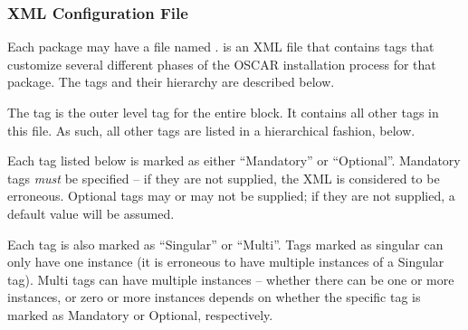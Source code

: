 
\subsubsection{XML Configuration File}
\label{sec:config-xml}

\begchange

Each package may have a file named .
 is an XML file that contains tags that customize
several different phases of the OSCAR installation process for that
package.  The tags and their hierarchy are described below.

The  tag is the outer level tag for the entire block.
It contains all other tags in this file. As such, all other tags are
listed in a hierarchical fashion, below.  

Each tag listed below is marked as either ``Mandatory'' or
``Optional''.  Mandatory tags {\em must} be specified -- if they are
not supplied, the XML is considered to be erroneous.  Optional tags
may or may not be supplied; if they are not supplied, a default value
will be assumed.  

Each tag is also marked as ``Singular'' or ``Multi''.  Tags marked as
singular can only have one instance (it is erroneous to have multiple
instances of a Singular tag).  Multi tags can have multiple instances
-- whether there can be one or more instances, or zero or more
instances depends on whether the specific tag is marked as Mandatory
or Optional, respectively.

